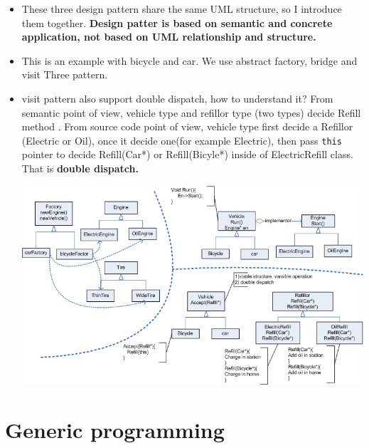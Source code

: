 \documentclass[a4paper,11pt,twoside]{book}
\begin{document}
\begin{itemize}
	\item These three design pattern share the same UML structure, so I introduce them together. \textbf{Design patter is based on semantic and concrete application, not based on UML relationship and structure.}
	
	\item This is an example with bicycle and car.  We use abstract factory, bridge and visit Three pattern. 
	
	\item visit pattern also support double dispatch, how to understand it? From semantic point of view, vehicle type and refillor type (two types) decide Refill method . From source code point of view, vehicle type first decide a Refillor (Electric or Oil), once it decide one(for example Electric), then pass \texttt{this} pointer to decide Refill(Car*) or Refill(Bicyle*) inside of ElectricRefill class. That is \textbf{double dispatch.} 

		\centering
		\includegraphics[width=0.93\linewidth]{pics/visitor.png}
	    
\end{itemize}

     
\chapter{Generic programming}
     
\end{document}
